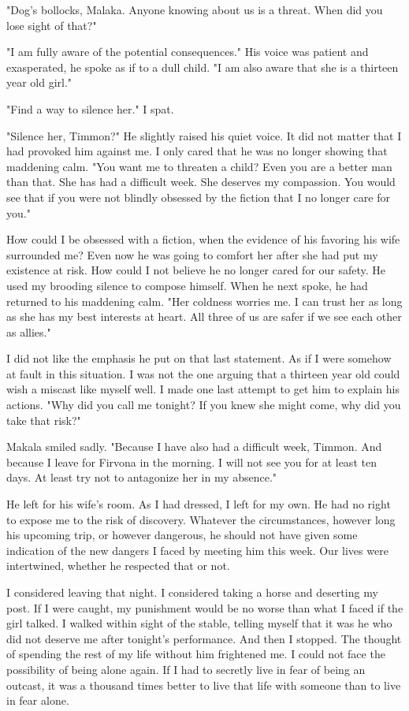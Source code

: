 \documentclass{article}
\begin{document}
"Dog's bollocks, Malaka. Anyone knowing about us is a threat. When did you lose sight of that?"

"I am fully aware of the potential consequences." His voice was patient and exasperated, he spoke as if to a dull child. "I am also aware that she is a thirteen year old girl."

"Find a way to silence her." I spat.

"Silence her, Timmon?" He slightly raised his quiet voice. It did not matter that I had provoked him against me. I only cared that he was no longer showing that maddening calm. "You want me to threaten a child? Even you are a better man than that. She has had a difficult week. She deserves my compassion. You would see that if you were not blindly obsessed by the fiction that I no longer care for you." 

How could I be obsessed with a fiction, when the evidence of his favoring his wife surrounded me? Even now he was going to comfort her after she had put my existence at risk. How could I not believe he no longer cared for our safety. He used my brooding silence to compose himself. When he next spoke, he had returned to his maddening calm. "Her coldness worries me. I can trust her as long as she has my best interests at heart. All three of us are safer if we see each other as allies."

I did not like the emphasis he put on that last statement. As if I were somehow at fault in this situation. I was not the one arguing that a thirteen year old could wish a miscast like myself well. I made one last attempt to get him to explain his actions. "Why did you call me tonight? If you knew she might come, why did you take that risk?"

Makala smiled sadly. "Because I have also had a difficult week, Timmon. And because I leave for Firvona in the morning. I will not see you for at least ten days. At least try not to antagonize her in my absence."

He left for his wife's room. As I had dressed, I left for my own.  He had no right to expose me to the risk of discovery. Whatever the circumstances, however long his upcoming trip, or however dangerous, he should not have given some indication of the new dangers I faced by meeting him this week. Our lives were intertwined, whether he respected that or not. 

I considered leaving that night. I considered taking a horse and deserting my post. If I were caught, my punishment would be no worse than what I faced if the girl talked. I walked within sight of the stable, telling myself that it was he who did not deserve me after tonight's performance. And then I stopped. The thought of spending the rest of my life without him frightened me. I could not face the possibility of being alone again. If I had to secretly live in fear of being an outcast, it was a thousand times better to live that life with someone than to live in fear alone.
\end{document}
